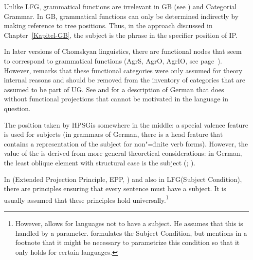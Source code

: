 Unlike LFG, grammatical functions are irrelevant in GB (see \citealp{Williams84a,Sternefeld85a}) and Categorial Grammar\indexcg. In GB, grammatical functions can only be
determined indirectly by making reference to tree positions. Thus, in the approach discussed in
Chapter~\ref{Kapitel-GB}, the subject is the phrase in the specifier position of IP.

In later versions of Chomskyan linguistics, there are functional nodes that seem to correspond to grammatical functions (AgrS,
AgrO, AgrIO, see
page~\pageref{Seite-AgrO}). However, \citet[Section~4.10.1]{Chomsky95a-u} remarks that these functional categories were only assumed for theory internal reasons
and should be removed from the inventory of categories that are assumed to be part of UG. See  and  for a description of German that does without functional projections
that cannot be motivated in the language in question.

The position taken by HPSG\indexhpsg is somewhere in the middle: a special valence feature is used for subjects (in grammars of German, there is a head feature that contains a
representation of the subject for non"=finite verb forms). However, the value of the \subjf is
derived from more general theoretical considerations: in German, the least oblique
element with structural case is the subject (\citealp[]{Mueller2002b};
\citealp[]{MuellerLehrbuch1}).

In \gbt (Extended Projection Principle, EPP, ) and also in LFG\indexlfg (Subject Condition), there are principles
ensuring that every sentence must have a subject. It is usually assumed that these principles hold universally.\footnote{ 
  However, \citet[]{Chomsky81a} allows for languages not to have a subject. He assumes that this is handled by a parameter.
 \citet[]{Bresnan2001a} formulates the Subject Condition, but mentions in a footnote that it might be necessary
to parametrize this condition so that it only holds for certain languages.%
} 
  
